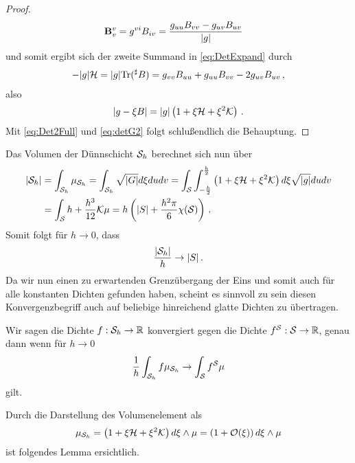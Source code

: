 \documentclass[a4paper,11pt]{scrartcl}
\newcommand{\Tr}{\text{Tr}}
\newcommand{\surfh}{\surf_{h}}
\newcommand{\landau}{\mathcal{O}}
\begin{document}
\begin{proof}
\begin{align}
    \mathbf{B}{^{v}_{v}} &= g^{vi} B_{iv} = \frac{g_{uu}B_{vv}-g_{uv}B_{uv}}{|g|}
  \end{align}
  und somit ergibt sich der zweite Summand in \eqref{eq:DetExpand} durch
  \begin{align}
    -|g|\meanCurvature = |g|\Tr(^{\sharp}B) = g_{vv}B_{uu} + g_{uu}B_{vv} - 2g_{uv}B_{uv}\formComma
  \end{align}
  also
  \begin{align}
    |g-\xi B | = |g|\left(  1 + \xi\mathcal{H} + \xi^{2}\mathcal{K} \right) \,\text{.}
  \end{align}
  Mit \eqref{eq:Det2Full} und \eqref{eq:detG2} folgt schlußendlich die Behauptung.
\end{proof}

Das Volumen der Dünnschicht \( \surfh \) berechnet sich nun über
\begin{align}
  |\surf_{h}| &= \int_{\surfh}\mu_{\surfh} 
               = \int_{\surfh}\sqrt{|G|} d\xi du dv
  = \int_{\surf}\int_{-\frac{h}{2}}^{\frac{h}{2}} \left( 1 + \xi\meanCurvature + \xi^{2}\gaussianCurvature \right) d\xi \sqrt{|g|} du dv\\
  &= \int_{\surf} h + \frac{h^{3}}{12}\gaussianCurvature \mu
   = h \left(|S| + \frac{h^{2}\pi}{6}\chi(\surf)\right)\formPeriod
\end{align}
Somit folgt für \( h\rightarrow 0 \), dass
\begin{align}
  \frac{|\surfh|}{h} \rightarrow |S| \formPeriod
\end{align}
Da wir nun einen zu erwartenden Grenzübergang der Eins und somit auch für alle konstanten Dichten gefunden haben,
scheint es sinnvoll zu sein diesen Konvergenzbegriff auch auf beliebige hinreichend glatte Dichten zu übertragen.

\begin{defn}\label{def:Convergence}
  Wir sagen die Dichte \( f:\surfh \rightarrow \R \) konvergiert gegen die Dichte 
  \( f^{\mathcal{S}}: \mathcal{S} \rightarrow \mathbb{R} \), genau dann wenn für \( h \rightarrow 0 \)
  \begin{align}
    \frac{1}{h}\int_{\surfh} f \mu_{\surfh} \rightarrow \int_{\surf} f^{\surf} \mu
  \end{align}
  gilt.
\end{defn}

Durch die Darstellung des Volumenelement als
\begin{align}
 \mu_{\surfh} =  \left(  1 + \xi\meanCurvature + \xi^{2}\gaussianCurvature \right) d\xi \wedge\mu
              = \left( 1 + \landau(\xi) \right) d\xi \wedge\mu
\end{align}
ist folgendes Lemma ersichtlich.
\end{document}
